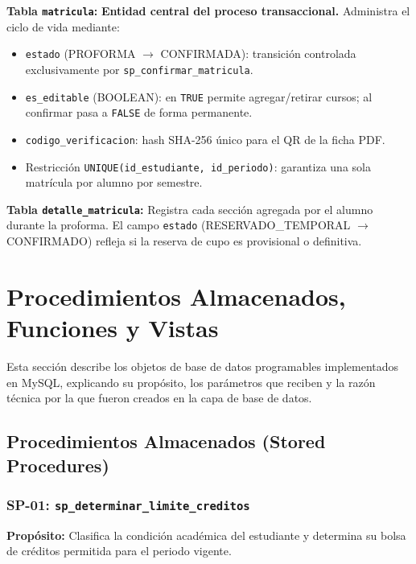 \documentclass[12pt,a4paper]{article}
\begin{document}
\textbf{Tabla \texttt{matricula}:} \textbf{Entidad central del proceso transaccional.} Administra el ciclo de vida mediante:
\begin{itemize}
  \item \texttt{estado} (PROFORMA $\to$ CONFIRMADA): transici\'on controlada exclusivamente por \texttt{sp\_confirmar\_matricula}.
  \item \texttt{es\_editable} (BOOLEAN): en \texttt{TRUE} permite agregar/retirar cursos; al confirmar pasa a \texttt{FALSE} de forma permanente.
  \item \texttt{codigo\_verificacion}: hash SHA-256 \'unico para el QR de la ficha PDF.
  \item Restricci\'on \texttt{UNIQUE(id\_estudiante, id\_periodo)}: garantiza una sola matr\'icula por alumno por semestre.
\end{itemize}

\textbf{Tabla \texttt{detalle\_matricula}:} Registra cada secci\'on agregada por el alumno durante la proforma. El campo \texttt{estado} (RESERVADO\_TEMPORAL $\to$ CONFIRMADO) refleja si la reserva de cupo es provisional o definitiva.

\newpage

\section{Procedimientos Almacenados, Funciones y Vistas}

Esta secci\'on describe los objetos de base de datos programables implementados en MySQL, explicando su prop\'osito, los par\'ametros que reciben y la raz\'on t\'ecnica por la que fueron creados en la capa de base de datos.

\subsection{Procedimientos Almacenados (Stored Procedures)}

\subsubsection{SP-01: \texttt{sp\_determinar\_limite\_creditos}}

\textbf{Prop\'osito:} Clasifica la condici\'on acad\'emica del estudiante y determina su bolsa de cr\'editos permitida para el periodo vigente.
\end{document}
